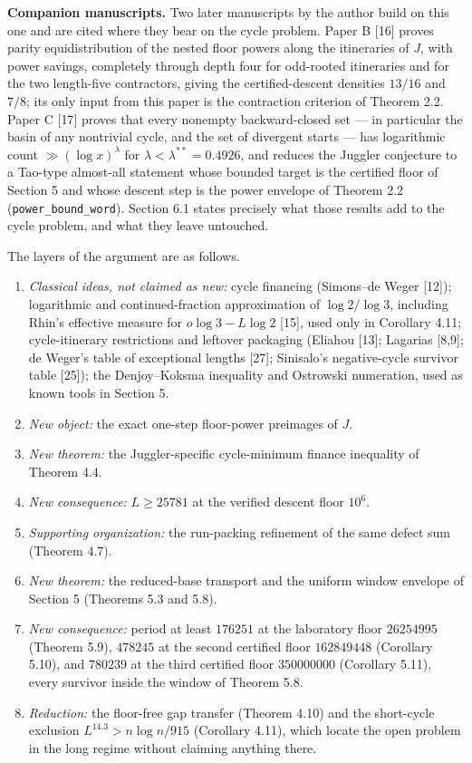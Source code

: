 \documentclass[12pt]{article}
\providecommand{\tightlist}{\setlength{\itemsep}{0pt}\setlength{\parskip}{0pt}}
\begin{document}
\textbf{Companion manuscripts.} Two later manuscripts by the author
build on this one and are cited where they bear on the cycle problem.
Paper B {[}16{]} proves parity equidistribution of the nested floor
powers along the itineraries of \(J\), with power savings, completely
through depth four for odd-rooted itineraries and for the two
length-five contractors, giving the certified-descent densities
\(13/16\) and \(7/8\); its only input from this paper is the contraction
criterion of Theorem 2.2. Paper C {[}17{]} proves that every nonempty
backward-closed set --- in particular the basin of any nontrivial cycle,
and the set of divergent starts --- has logarithmic count
\(\gg(\log x)^{\lambda}\) for \(\lambda<\lambda^{**}=0.4926\), and
reduces the Juggler conjecture to a Tao-type almost-all statement whose
bounded target is the certified floor of Section 5 and whose descent
step is the power envelope of Theorem 2.2
(\texttt{\nolinkurl{power_bound_word}}). Section 6.1 states precisely
what those results add to the cycle problem, and what they leave
untouched.

The layers of the argument are as follows.

\begin{enumerate}
\def\labelenumi{\arabic{enumi}.}
\tightlist
\item
  \emph{Classical ideas, not claimed as new:} cycle financing
  (Simons--de Weger {[}12{]}); logarithmic and continued-fraction
  approximation of \(\log 2/\log 3\), including Rhin's effective measure
  for \(o\log 3-L\log 2\) {[}15{]}, used only in Corollary 4.11;
  cycle-itinerary restrictions and leftover packaging (Eliahou {[}13{]};
  Lagarias {[}8,9{]}; de Weger's table of exceptional lengths {[}27{]};
  Sinisalo's negative-cycle survivor table {[}25{]}); the Denjoy--Koksma
  inequality and Ostrowski numeration, used as known tools in Section 5.
\item
  \emph{New object:} the exact one-step floor-power preimages of \(J\).
\item
  \emph{New theorem:} the Juggler-specific cycle-minimum finance
  inequality of Theorem 4.4.
\item
  \emph{New consequence:} \(L\ge 25781\) at the verified descent floor
  \(10^6\).
\item
  \emph{Supporting organization:} the run-packing refinement of the same
  defect sum (Theorem 4.7).
\item
  \emph{New theorem:} the reduced-base transport and the uniform window
  envelope of Section 5 (Theorems 5.3 and 5.8).
\item
  \emph{New consequence:} period at least \(176251\) at the laboratory
  floor \(26254995\) (Theorem 5.9), \(478245\) at the second certified
  floor \(162849448\) (Corollary 5.10), and \(780239\) at the third
  certified floor \(350000000\) (Corollary 5.11), every survivor inside
  the window of Theorem 5.8.
\item
  \emph{Reduction:} the floor-free gap transfer (Theorem 4.10) and the
  short-cycle exclusion \(L^{14.3}>n\log n/915\) (Corollary 4.11), which
  locate the open problem in the long regime without claiming anything
  there.
\end{enumerate}
\end{document}
